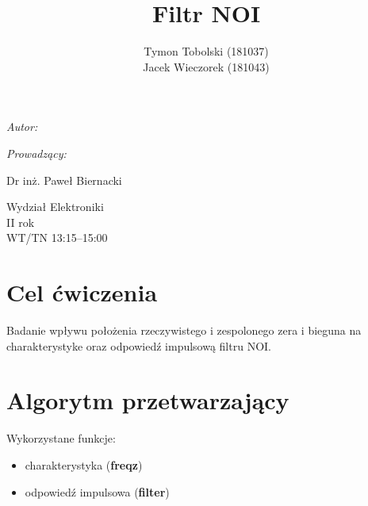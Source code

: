 \documentclass[wide,a4paper,titlepage,12pt]{mwart}
\title{Filtr NOI}
\author{Tymon Tobolski (181037)\\ Jacek Wieczorek (181043)}
\makeatletter
\renewcommand{\maketitle}{
\begin{titlepage}
  \begin{center}
    \vspace*{3cm}
    \LARGE \@title \par
    \vspace{2cm}
    \textit{\small Autor:}\par
    \normalsize \@author\par \normalsize
    \vspace{3cm}
    \textit{\small Prowadzący:}\par
    Dr inż. Paweł Biernacki \par
    \vspace{2cm}
    Wydział Elektroniki\\ II rok\\ WT/TN 13:15--15:00 \par
    \vspace{5cm}
    \small \@date
  \end{center}
\end{titlepage}
}
\makeatother
\begin{document}
  \maketitle
  \section{Cel ćwiczenia} %
  \label{sec:Cel}
    Badanie wpływu położenia rzeczywistego i zespolonego zera i bieguna na charakterystyke oraz odpowiedź impulsową filtru NOI.
    
  \section{Algorytm przetwarzający}
    Wykorzystane funkcje:
    \newline
    \begin{itemize}
			\item charakterystyka (\textbf{freqz})
			\item odpowiedź impulsowa (\textbf{filter})
    \end{itemize}
  
  \lstset{ %
    language=Octave,                %
    basicstyle=\scriptsize,       %
    numbers=left,                   %
    numberstyle=\scriptsize,      %
    stepnumber=10,                   %
    numbersep=9pt,                  %
    showspaces=false,               %
    showstringspaces=false,         %
    showtabs=false,                 %
    breaklines=true,                %
    }
    
    
\end{document}
